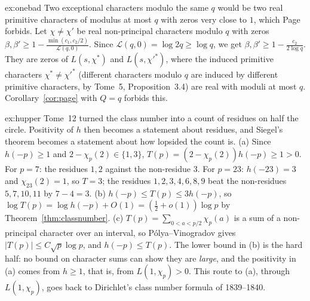 \begin{solution}{ex:onebad}
\idea Two exceptional characters modulo the same $q$ would be two real primitive characters of modulus at most $q$ with zeros very close to $1$, which Page forbids.
\writeup Let $\chi\ne\chi'$ be real non-principal characters modulo $q$ with zeros $\beta,\beta'\ge1-\frac{\min(c_1,c_2/2)}{\mathcal L(q,0)}$. Since $\mathcal L(q,0)=\log2q\ge\log q$, we get $\beta,\beta'\ge1-\frac{c_2}{2\log q}$. They are zeros of $L(s,\chi^*)$ and $L(s,\chi'^*)$, where the induced primitive characters $\chi^*\ne\chi'^*$ (different characters modulo $q$ are induced by
different primitive characters, by Tome~5, Proposition~3.4) are real with moduli at most $q$. Corollary~\ref{cor:page} with $Q=q$ forbids this.
\end{solution}

\begin{solution}{ex:hupper}
\idea Tome~12 turned the class number into a count of residues on half the circle. Positivity of $h$ then becomes a statement about residues, and Siegel's theorem becomes a statement about how lopsided the count is.
\writeup (a) Since $h(-p)\ge1$ and $2-\chi_p(2)\in\{1,3\}$, $T(p)=(2-\chi_p(2))h(-p)\ge1>0$. For $p=7$: the residues $1,2$ against the non-residue $3$. For $p=23$: $h(-23)=3$ and $\chi_{23}(2)=1$, so $T=3$; the residues $1,2,3,4,6,8,9$ beat the non-residues $5,7,10,11$ by $7-4=3$.
(b) $h(-p)\le T(p)\le3h(-p)$, so $\log T(p)=\log h(-p)+O(1)=(\frac12+o(1))\log p$ by Theorem~\ref{thm:classnumber}.
(c) $T(p)=\sum_{0<a<p/2}\chi_p(a)$ is a sum of a non-principal character over an interval, so Pólya--Vinogradov gives $|T(p)|\le C\sqrt p\log p$, and $h(-p)\le T(p)$. The lower bound in (b) is the hard half: no bound on character sums can show they are \emph{large}, and the positivity in (a) comes from $h\ge1$, that is, from $L(1,\chi_p)>0$. This route to (a), through $L(1,\chi_p)$, goes back to Dirichlet's class number formula of 1839--1840.
\end{solution}

